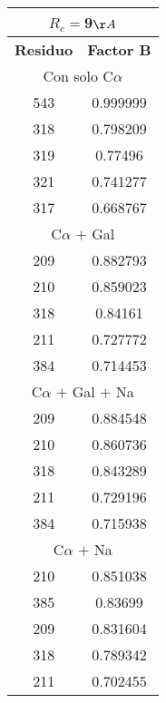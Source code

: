 \begin{tabular}[c]{|c|c|}
\multicolumn{2}{c}{$R_c=$9$\AA$}\\\hline
\textbf{Residuo}&\textbf{Factor B}\\\hline
\multicolumn{2}{c}{Con solo C$\alpha$}\\\hline
       543&  0.999999\\
       318&  0.798209\\
       319&   0.77496\\
       321&  0.741277\\
       317&  0.668767\\
\hline
\multicolumn{2}{c}{C$\alpha$ $+$ Gal}\\\hline
       209&  0.882793\\
       210&  0.859023\\
       318&   0.84161\\
       211&  0.727772\\
       384&  0.714453\\
\hline
\multicolumn{2}{c}{C$\alpha$ $+$ Gal $+$ Na}\\\hline
       209&  0.884548\\
       210&  0.860736\\
       318&  0.843289\\
       211&  0.729196\\
       384&  0.715938\\
\hline
\multicolumn{2}{c}{C$\alpha$ $+$ Na}\\\hline
       210&  0.851038\\
       385&   0.83699\\
       209&  0.831604\\
       318&  0.789342\\
       211&  0.702455\\
\hline
\end{tabular}
